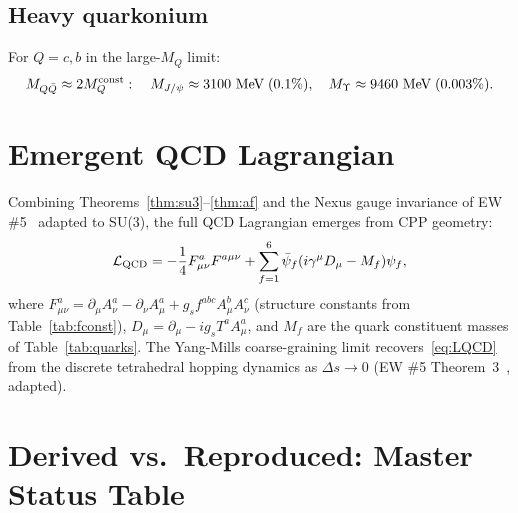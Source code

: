 \documentclass[11pt,a4paper]{article}
\begin{document}
\subsection{Heavy quarkonium}

For $Q = c, b$ in the large-$M_Q$ limit:
\begin{equation}
M_{Q\bar{Q}} \approx 2M_Q^{\rm const}:
\quad M_{J/\psi} \approx 3100\ \text{MeV}\; (0.1\%),\quad
M_{\Upsilon} \approx 9460\ \text{MeV}\; (0.003\%).
\label{eq:quarkonium}
\end{equation}

\section{Emergent QCD Lagrangian}
\label{sec:lagrangian}

Combining Theorems~\ref{thm:su3}--\ref{thm:af} and the
Nexus gauge invariance of EW \#5~\citep{cpp_ew5} adapted to SU(3),
the full QCD Lagrangian emerges from CPP geometry:
\begin{equation}
\mathcal{L}_{\rm QCD}
= -\frac{1}{4}F^a_{\mu\nu}F^{a\mu\nu}
+ \sum_{f=1}^{6}\bar{\psi}_f(i\gamma^\mu D_\mu - M_f)\psi_f,
\label{eq:LQCD}
\end{equation}
where $F^a_{\mu\nu} = \partial_\mu A^a_\nu - \partial_\nu A^a_\mu
+ g_s f^{abc}A^b_\mu A^c_\nu$ (structure constants from
Table~\ref{tab:fconst}), $D_\mu = \partial_\mu - ig_s T^a A^a_\mu$,
and $M_f$ are the quark constituent masses of Table~\ref{tab:quarks}.
The Yang-Mills coarse-graining limit recovers~\eqref{eq:LQCD} from
the discrete tetrahedral hopping dynamics as $\Delta s \to 0$
(EW \#5 Theorem~3~\citep{cpp_ew5}, adapted).

\section{Derived vs.\ Reproduced: Master Status Table}
\label{sec:status}
\end{document}
